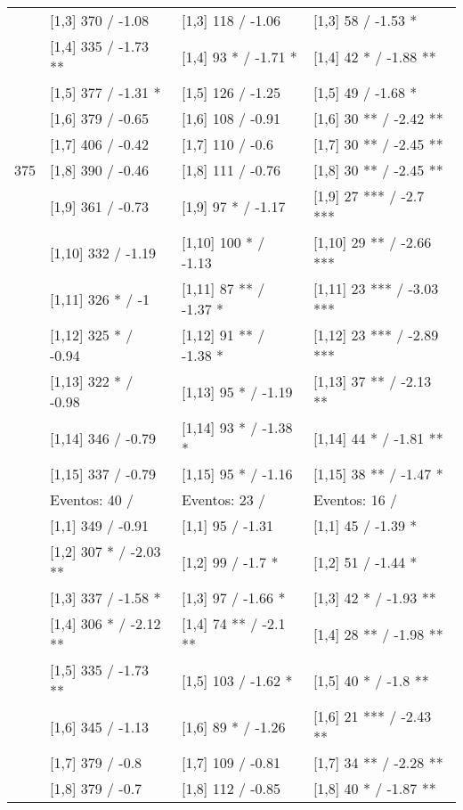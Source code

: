 \begin{table}
\begin{tabular}[t]{llll}
 & {}[1,3] 370  / -1.08 & {}[1,3] 118  / -1.06 & {}[1,3] 58  / -1.53 *\\
\addlinespace
 & {}[1,4] 335  / -1.73 ** & {}[1,4] 93 * / -1.71 * & {}[1,4] 42 * / -1.88 **\\
 & {}[1,5] 377  / -1.31 * & {}[1,5] 126  / -1.25 & {}[1,5] 49  / -1.68 *\\
 & {}[1,6] 379  / -0.65 & {}[1,6] 108  / -0.91 & {}[1,6] 30 ** / -2.42 **\\
 & {}[1,7] 406  / -0.42 & {}[1,7] 110  / -0.6 & {}[1,7] 30 ** / -2.45 **\\
375 & {}[1,8] 390  / -0.46 & {}[1,8] 111  / -0.76 & {}[1,8] 30 ** / -2.45 **\\
\addlinespace
 & {}[1,9] 361  / -0.73 & {}[1,9] 97 * / -1.17 & {}[1,9] 27 *** / -2.7 ***\\
 & {}[1,10] 332  / -1.19 & {}[1,10] 100 * / -1.13 & {}[1,10] 29 ** / -2.66 ***\\
 & {}[1,11] 326 * / -1 & {}[1,11] 87 ** / -1.37 * & {}[1,11] 23 *** / -3.03 ***\\
 & {}[1,12] 325 * / -0.94 & {}[1,12] 91 ** / -1.38 * & {}[1,12] 23 *** / -2.89 ***\\
 & {}[1,13] 322 * / -0.98 & {}[1,13] 95 * / -1.19 & {}[1,13] 37 ** / -2.13 **\\
\addlinespace
 & {}[1,14] 346  / -0.79 & {}[1,14] 93 * / -1.38 * & {}[1,14] 44 * / -1.81 **\\
 & {}[1,15] 337  / -0.79 & {}[1,15] 95 * / -1.16 & {}[1,15] 38 ** / -1.47 *\\
 & Eventos:  40 / & Eventos:  23 / & Eventos:  16 /\\
 & {}[1,1] 349  / -0.91 & {}[1,1] 95  / -1.31 & {}[1,1] 45  / -1.39 *\\
 & {}[1,2] 307 * / -2.03 ** & {}[1,2] 99  / -1.7 * & {}[1,2] 51  / -1.44 *\\
\addlinespace
 & {}[1,3] 337  / -1.58 * & {}[1,3] 97  / -1.66 * & {}[1,3] 42 * / -1.93 **\\
 & {}[1,4] 306 * / -2.12 ** & {}[1,4] 74 ** / -2.1 ** & {}[1,4] 28 ** / -1.98 **\\
 & {}[1,5] 335  / -1.73 ** & {}[1,5] 103  / -1.62 * & {}[1,5] 40 * / -1.8 **\\
 & {}[1,6] 345  / -1.13 & {}[1,6] 89 * / -1.26 & {}[1,6] 21 *** / -2.43 **\\
 & {}[1,7] 379  / -0.8 & {}[1,7] 109  / -0.81 & {}[1,7] 34 ** / -2.28 **\\
\addlinespace
500 & {}[1,8] 379  / -0.7 & {}[1,8] 112  / -0.85 & {}[1,8] 40 * / -1.87 **\\

\end{tabular}
\end{table}

